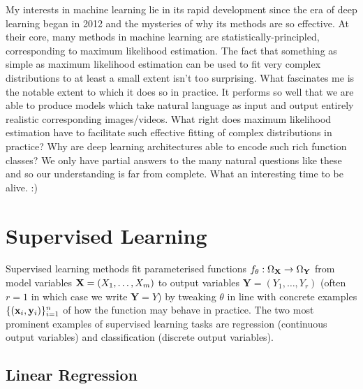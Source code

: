 \documentclass[11pt]{article}
\begin{document}
My interests in machine learning lie in its rapid development since the era of deep learning began in 2012 and the mysteries of why its methods are so effective. At their core, many methods in machine learning are statistically-principled, corresponding to maximum likelihood estimation. The fact that something as simple as maximum likelihood estimation can be used to fit very complex distributions to at least a small extent isn't too surprising. What fascinates me is the notable extent to which it does so in practice. It performs so well that we are able to produce models which take natural language as input and output entirely realistic corresponding images/videos. What right does maximum likelihood estimation have to facilitate such effective fitting of complex distributions in practice? Why are deep learning architectures able to encode such rich function classes? We only have partial answers to the many natural questions like these and so our understanding is far from complete. What an interesting time to be alive. :)

\section{Supervised Learning}
Supervised learning methods fit parameterised functions $f_{\theta}:\Omega_{\mathbf{X}}\to\Omega_{\mathbf{Y}}$ from model variables $\mathbf{X}=(X_1,\dots,X_m)$ to output variables $\mathbf{Y}=(Y_1,\dots,Y_r)$ (often $r=1$ in which case we write $\mathbf{Y}=Y$) by tweaking $\theta$ in line with concrete examples $\{(\mathbf{x}_i,\mathbf{y}_i)\}_{i=1}^n$ of how the function may behave in practice. The two most prominent examples of supervised learning tasks are regression (continuous output variables) and classification (discrete output variables).

\subsection{Linear Regression}
\end{document}
